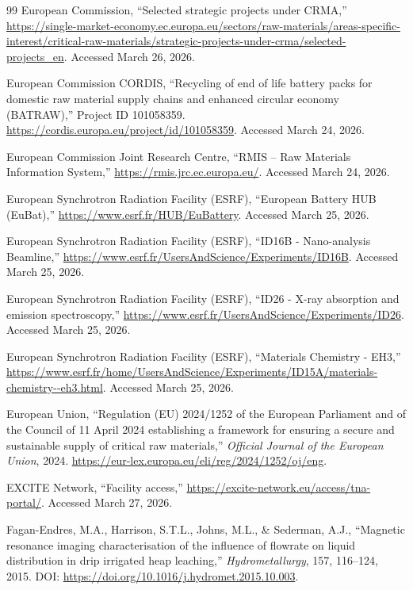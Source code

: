 \documentclass[12pt,a4paper]{article}
\begin{document}
\begin{thebibliography}{99}
European Commission, ``Selected strategic projects under CRMA,'' \url{https://single-market-economy.ec.europa.eu/sectors/raw-materials/areas-specific-interest/critical-raw-materials/strategic-projects-under-crma/selected-projects_en}. Accessed March 26, 2026.

European Commission CORDIS, ``Recycling of end of life battery packs for domestic raw material supply chains and enhanced circular economy (BATRAW),'' Project ID 101058359. \url{https://cordis.europa.eu/project/id/101058359}. Accessed March 24, 2026.

European Commission Joint Research Centre, ``RMIS -- Raw Materials Information System,'' \url{https://rmis.jrc.ec.europa.eu/}. Accessed March 24, 2026.

European Synchrotron Radiation Facility (ESRF), ``European Battery HUB (EuBat),'' \url{https://www.esrf.fr/HUB/EuBattery}. Accessed March 25, 2026.

European Synchrotron Radiation Facility (ESRF), ``ID16B - Nano-analysis Beamline,'' \url{https://www.esrf.fr/UsersAndScience/Experiments/ID16B}. Accessed March 25, 2026.

European Synchrotron Radiation Facility (ESRF), ``ID26 - X-ray absorption and emission spectroscopy,'' \url{https://www.esrf.fr/UsersAndScience/Experiments/ID26}. Accessed March 25, 2026.

European Synchrotron Radiation Facility (ESRF), ``Materials Chemistry - EH3,'' \url{https://www.esrf.fr/home/UsersAndScience/Experiments/ID15A/materials-chemistry--eh3.html}. Accessed March 25, 2026.

European Union, ``Regulation (EU) 2024/1252 of the European Parliament and of the Council of 11 April 2024 establishing a framework for ensuring a secure and sustainable supply of critical raw materials,'' \textit{Official Journal of the European Union}, 2024. \url{https://eur-lex.europa.eu/eli/reg/2024/1252/oj/eng}.

EXCITE Network, ``Facility access,'' \url{https://excite-network.eu/access/tna-portal/}. Accessed March 27, 2026.

Fagan-Endres, M.A., Harrison, S.T.L., Johns, M.L., \& Sederman, A.J., ``Magnetic resonance imaging characterisation of the influence of flowrate on liquid distribution in drip irrigated heap leaching,'' \textit{Hydrometallurgy}, 157, 116--124, 2015. DOI: \url{https://doi.org/10.1016/j.hydromet.2015.10.003}.


\end{thebibliography}
\end{document}
